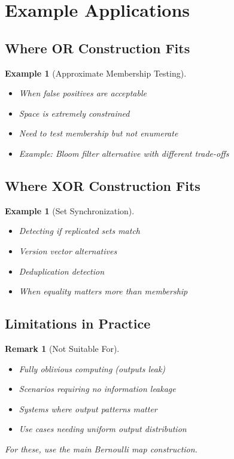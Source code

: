 \documentclass[11pt,final,hidelinks]{article}
\newtheorem{example}[theorem]{Example}
\newtheorem{remark}[theorem]{Remark}
\begin{document}
\section{Example Applications}

\subsection{Where OR Construction Fits}

\begin{example}[Approximate Membership Testing]
\begin{itemize}
    \item When false positives are acceptable
    \item Space is extremely constrained
    \item Need to test membership but not enumerate
    \item Example: Bloom filter alternative with different trade-offs
\end{itemize}
\end{example}

\subsection{Where XOR Construction Fits}

\begin{example}[Set Synchronization]
\begin{itemize}
    \item Detecting if replicated sets match
    \item Version vector alternatives
    \item Deduplication detection
    \item When equality matters more than membership
\end{itemize}
\end{example}

\subsection{Limitations in Practice}

\begin{remark}[Not Suitable For]
\begin{itemize}
    \item Fully oblivious computing (outputs leak)
    \item Scenarios requiring no information leakage
    \item Systems where output patterns matter
    \item Use cases needing uniform output distribution
\end{itemize}
For these, use the main Bernoulli map construction.
\end{remark}
\end{document}
